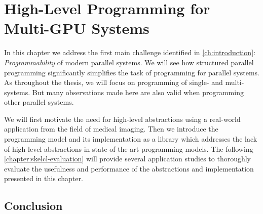
\chapter{High-Level Programming for Multi-GPU Systems}
%
%

\label{chapter:skelcl}

In this chapter we address the first main challenge identified in \autoref{ch:introduction}: \emph{Programmability} of modern parallel systems.
We will see how structured parallel programming significantly simplifies the task of programming for parallel systems.
As throughout the thesis, we will focus on programming of single- and multi-\GPU systems.
But many observations made here are also valid when programming other parallel systems.

We will first motivate the need for high-level abstractions using a real-world \OpenCL application from the field of medical imaging.
Then we introduce the \emph{\SkelCL} programming model and its implementation as a \Cpp library which addresses the lack of high-level abstractions in state-of-the-art \GPU programming models.
The following \autoref{chapter:skelcl-evaluation} will provide several application studies to thoroughly evaluate the usefulness and performance of the abstractions and implementation presented in this chapter.









\section{Conclusion}

